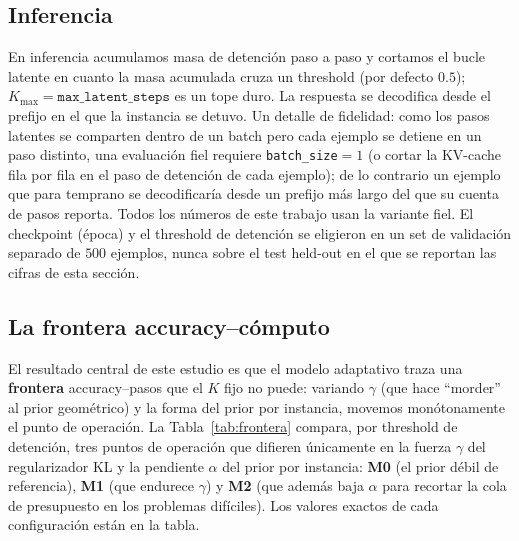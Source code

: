 \documentclass[11pt]{article}
\begin{document}
\subsection{Inferencia}
\label{sec:inferencia}

En inferencia acumulamos masa de detención paso a paso y cortamos el bucle latente en cuanto la masa acumulada cruza un threshold (por defecto $0.5$); $K_{\max} = \texttt{max\_latent\_steps}$ es un tope duro. La respuesta se decodifica desde el prefijo en el que la instancia se detuvo. Un detalle de fidelidad: como los pasos latentes se comparten dentro de un batch pero cada ejemplo se detiene en un paso distinto, una evaluación fiel requiere \texttt{batch\_size}$=1$ (o cortar la KV-cache fila por fila en el paso de detención de cada ejemplo); de lo contrario un ejemplo que para temprano se decodificaría desde un prefijo más largo del que su cuenta de pasos reporta. Todos los números de este trabajo usan la variante fiel. El checkpoint (época) y el threshold de detención se eligieron en un set de validación separado de $500$ ejemplos, nunca sobre el test held-out en el que se reportan las cifras de esta sección.

\subsection{La frontera accuracy--cómputo}
\label{sec:frontera}

El resultado central de este estudio es que el modelo adaptativo traza una \textbf{frontera} accuracy--pasos que el $K$ fijo no puede: variando $\gamma$ (que hace ``morder'' al prior geométrico) y la forma del prior por instancia, movemos monótonamente el punto de operación. La Tabla~\ref{tab:frontera} compara, por threshold de detención, tres puntos de operación que difieren únicamente en la fuerza $\gamma$ del regularizador KL y la pendiente $\alpha$ del prior por instancia: \textbf{M0} (el prior débil de referencia), \textbf{M1} (que endurece $\gamma$) y \textbf{M2} (que además baja $\alpha$ para recortar la cola de presupuesto en los problemas difíciles). Los valores exactos de cada configuración están en la tabla.
\end{document}
